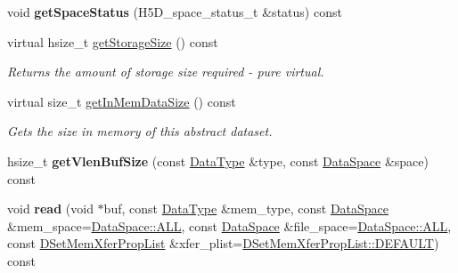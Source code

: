 \begin{DoxyCompactItemize}
\mbox{\label{class_h5_1_1_data_set_a958910ebece0c91ea715fa39bad09968}} 
void {\bfseries get\+Space\+Status} (H5\+D\+\_\+space\+\_\+status\+\_\+t \&status) const
\item 
\mbox{\label{class_h5_1_1_data_set_a7ef2ec029595abb0966cc3702466438c}} 
virtual hsize\+\_\+t \hyperlink{class_h5_1_1_data_set_a7ef2ec029595abb0966cc3702466438c}{get\+Storage\+Size} () const
\begin{DoxyCompactList}\small\item\em Returns the amount of storage size required -\/ pure virtual. \end{DoxyCompactList}\item 
\mbox{\label{class_h5_1_1_data_set_a8e1bb560e3e48dfdea3a1a96a433025e}} 
virtual size\+\_\+t \hyperlink{class_h5_1_1_data_set_a8e1bb560e3e48dfdea3a1a96a433025e}{get\+In\+Mem\+Data\+Size} () const
\begin{DoxyCompactList}\small\item\em Gets the size in memory of this abstract dataset. \end{DoxyCompactList}\item 
\mbox{\label{class_h5_1_1_data_set_a24dd2b5841d77973604190bd2d57d458}} 
hsize\+\_\+t {\bfseries get\+Vlen\+Buf\+Size} (const \hyperlink{class_h5_1_1_data_type}{Data\+Type} \&type, const \hyperlink{class_h5_1_1_data_space}{Data\+Space} \&space) const
\item 
\mbox{\label{class_h5_1_1_data_set_ae6f3866fcdc8eb6c7fbd2f6c31927616}} 
void {\bfseries read} (void $\ast$buf, const \hyperlink{class_h5_1_1_data_type}{Data\+Type} \&mem\+\_\+type, const \hyperlink{class_h5_1_1_data_space}{Data\+Space} \&mem\+\_\+space=\hyperlink{class_h5_1_1_data_space_ae8a22405edd631eb923a327d39462ff2}{Data\+Space\+::\+A\+LL}, const \hyperlink{class_h5_1_1_data_space}{Data\+Space} \&file\+\_\+space=\hyperlink{class_h5_1_1_data_space_ae8a22405edd631eb923a327d39462ff2}{Data\+Space\+::\+A\+LL}, const \hyperlink{class_h5_1_1_d_set_mem_xfer_prop_list}{D\+Set\+Mem\+Xfer\+Prop\+List} \&xfer\+\_\+plist=\hyperlink{class_h5_1_1_d_set_mem_xfer_prop_list_ae69bf0ec7bccd4bb793ffe1ff770d8c4}{D\+Set\+Mem\+Xfer\+Prop\+List\+::\+D\+E\+F\+A\+U\+LT}) const
\item 

\end{DoxyCompactItemize}

